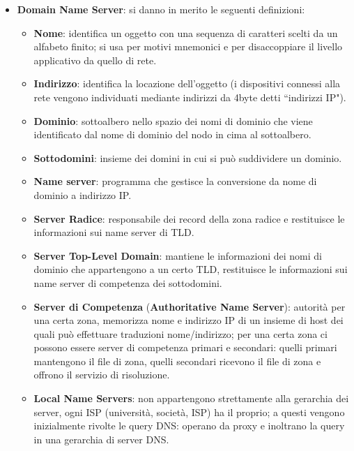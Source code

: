 \documentclass[11pt, italian, openany]{book}
\begin{document}
\begin{sloppypar}
\begin{itemize}[topsep=0pt]
	\item \textbf{Domain Name Server}: si danno in merito le seguenti definizioni:
	\vspace{-3.5mm}
	\begin{itemize}
		\itemsep-0.3em 
		\item \textbf{Nome}: identifica un oggetto con una sequenza di caratteri scelti da un alfabeto finito; si usa per motivi mnemonici e per disaccoppiare
		il livello applicativo da quello di rete.
		\item \textbf{Indirizzo}: identifica la locazione dell'oggetto (i dispositivi connessi alla rete vengono individuati mediante indirizzi da 4byte detti
		``indirizzi IP").
		\item \textbf{Dominio}: sottoalbero nello spazio dei nomi di dominio che viene identificato dal nome di dominio del nodo in cima al sottoalbero.
		\item \textbf{Sottodomini}: insieme dei domini in cui si pu\`o suddividere un dominio.
		\item \textbf{Name server}: programma che gestisce la conversione da nome di dominio a indirizzo IP.
		\item \textbf{Server Radice}: responsabile dei record della zona radice e restituisce le informazioni sui name server di TLD.
		\item \textbf{Server Top-Level Domain}: mantiene le informazioni dei nomi di dominio che appartengono a un certo TLD, restituisce le informazioni
		sui name server di competenza dei sottodomini.
		\item \textbf{Server di Competenza} (\textbf{Authoritative Name Server}): autorità per una certa zona, memorizza nome e indirizzo IP di un insieme di
		host dei quali può effettuare traduzioni nome/indirizzo; per una certa zona ci possono essere server di competenza primari e secondari:
		quelli primari mantengono il file di zona, quelli secondari ricevono il file di zona e offrono il servizio di risoluzione.
		\item \textbf{Local Name Servers}: non appartengono strettamente alla gerarchia dei server, ogni ISP (università, società, ISP) ha il proprio; a questi
		vengono inizialmente rivolte le query DNS: operano da proxy e inoltrano la query in una gerarchia di server DNS.
	\end{itemize}


\end{itemize}
\end{sloppypar}
\end{document}
